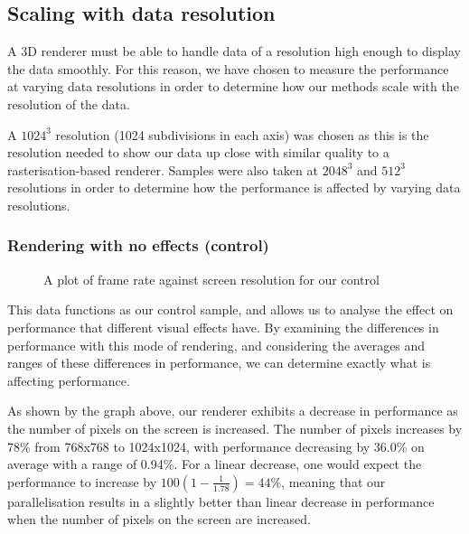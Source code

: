 \subsection{Scaling with data resolution}
A 3D renderer must be able to handle data of a resolution high enough to display the data smoothly. For this reason, we have chosen to measure the performance at varying data resolutions in order to determine how our methods scale with the resolution of the data.

 A $1024^3$ resolution (1024 subdivisions in each axis) was chosen as this is the resolution needed to show our data up close with similar quality to a rasterisation-based renderer. Samples were also taken at $2048^3$ and $512^3$ resolutions in order to determine how the performance is affected by varying data resolutions.

\subsubsection{Rendering with no effects (control)}
\begin{figure}[H]
\centering
{}

\caption{A plot of frame rate against screen resolution for our control}
\end{figure}

This data functions as our control sample, and allows us to analyse the effect on performance that different visual effects have. By examining the differences in performance with this mode of rendering, and considering the averages and ranges of these differences in performance, we can determine exactly what is affecting performance.

As shown by the graph above, our renderer exhibits a decrease in performance as the number of pixels on the screen is increased. The number of pixels increases by 78\% from 768x768 to 1024x1024, with performance decreasing by 36.0\% on average with a range of 0.94\%. For a linear decrease, one would expect the performance to increase by $100 (1 -\frac{1}{1.78}) = 44\%$, meaning that our parallelisation results in a slightly better than linear decrease in performance when the number of pixels on the screen are increased.

